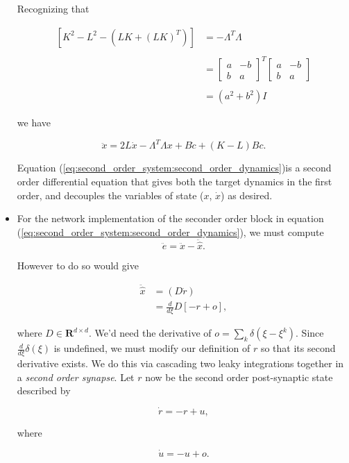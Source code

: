 \begin{itemize}
Recognizing that 

\begin{align*}
\left[ K^2 - L^2 - \left(LK + \left(LK\right)^T\right)\right]
&= -\Lambda^T \Lambda
\\
\\
&=
\begin{bmatrix}
a & - b
\\
b & a
\end{bmatrix}^T
\begin{bmatrix}
a & - b
\\
b & a
\end{bmatrix}
\\
\\
&=
(a^2 + b^2)I
\end{align*}

we have 

\begin{equation}
\label{eq:second_order_system:second_order_dynamics}
\ddot{x} = 2 L \dot{x} - \Lambda^T \Lambda x + B\dot{c} + (K - L)Bc.
\end{equation}

Equation (\ref{eq:second_order_system:second_order_dynamics})is a second order differential equation that gives both the target dynamics in the first order, and decouples the variables of state ($x$, $\dot{x}$) as desired.  

\item For the network implementation of the seconder order block in equation (\ref{eq:second_order_system:second_order_dynamics}), we must compute 
$$
\ddot{e} = \ddot{x} - \ddot{\hat{x}}.
$$

However to do so would give 

\begin{align*}
\ddot{\hat{x}} 
&= 
(D\ddot{r})
\\
&= 
\frac{d}{d\xi}D \left[-r + o\right],
\end{align*}

where $D \in \mathbf{R}^{d \times d}$. We'd need the derivative of $o = \sum_k\delta(\xi-\xi^k)$. Since $\frac{d}{d\xi}\delta(\xi)$ is undefined, we must modify our definition of $r$ so that its second derivative exists. We do this via cascading two leaky integrations together in a \textit{second order synapse}. Let $r$ now be the second order post-synaptic state described by

$$
\dot{r} = -r + u,
$$

where

$$
\dot{u} = -u + o.
$$


\end{itemize}
